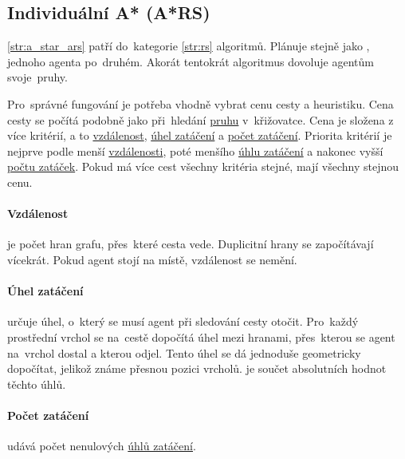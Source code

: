 \subsection{Individuální A* (A*RS)}\label{subsec:individualni_a_star}


\ref{str:a_star_ars} patří do~kategorie \ref{str:rs} algoritmů.
Plánuje stejně jako , jednoho agenta po~druhém.
Akorát tentokrát algoritmus dovoluje agentům  svoje~pruhy.

Pro~správné fungování  je potřeba vhodně vybrat cenu cesty a heuristiku.
Cena cesty se počítá podobně jako při~hledání \hyperref[par:pruh]{pruhu} v~křižovatce.
Cena je složena z více kritérií, a to \hyperref[par:ars_vzdalenost]{vzdálenost},
\hyperref[par:ars_uhel_zataceni]{úhel zatáčení} a \hyperref[par:ars_pocet_zataceni]{počet zatáčení}.
Priorita kritérií je nejprve podle menší \hyperref[par:ars_vzdalenost]{vzdálenosti},
poté menšího \hyperref[par:ars_uhel_zataceni]{úhlu zatáčení}
a nakonec vyšší \hyperref[par:ars_pocet_zataceni]{počtu zatáček}.
Pokud má více cest všechny kritéria stejné, mají všechny stejnou cenu.

\paragraph{Vzdálenost}\label{par:ars_vzdalenost} je počet hran grafu, přes~které cesta vede.
Duplicitní hrany se započítávají vícekrát.
Pokud agent stojí na místě, vzdálenost se nemění.

\paragraph{Úhel zatáčení}\label{par:ars_uhel_zataceni} určuje úhel, o~který se musí agent při sledování cesty otočit.
Pro~každý prostřední vrchol se na~cestě dopočítá úhel mezi hranami,
přes~kterou se agent na~vrchol dostal a kterou odjel.
Tento úhel se dá jednoduše geometricky dopočítat, jelikož známe přesnou pozici vrcholů.
 je součet absolutních hodnot těchto úhlů.

\paragraph{Počet zatáčení}\label{par:ars_pocet_zataceni} udává počet
nenulových \hyperref[par:ars_uhel_zataceni]{úhlů zatáčení}.

